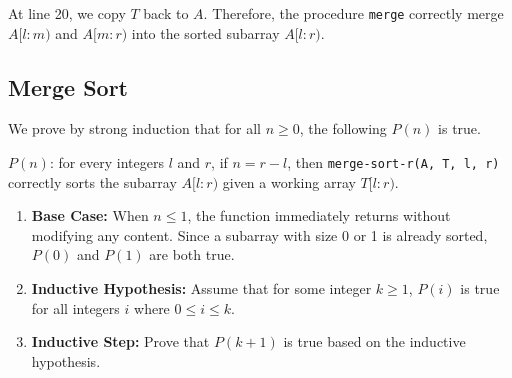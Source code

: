 \documentclass[12pt]{article}
\begin{document}
At line 20, we copy \(T\) back to \(A\). Therefore, the procedure \verb|merge| correctly merge \(A[l : m)\) and \(A[m : r)\) into the sorted subarray \(A[l : r)\).

\subsection*{Merge Sort}

We prove by strong induction that for all \(n \geq 0\), the following \(P(n)\) is true.

\(P(n)\): for every integers \(l\) and \(r\), if \(n = r - l\), then \verb|merge-sort-r(A, T, l, r)| correctly sorts the subarray \(A[l : r)\) given a working array \(T[l : r)\).

\begin{enumerate}
    \item \textbf{Base Case:} When \(n \leq 1\), the function immediately returns without modifying any content. Since a subarray with size 0 or 1 is already sorted, \(P(0)\) and \(P(1)\) are both true.

    \item \textbf{Inductive Hypothesis:} Assume that for some integer \(k \geq 1\), \(P(i)\) is true for all integers \(i\) where \(0 \leq i \leq k\).

    \item \textbf{Inductive Step:} Prove that \(P(k+1)\) is true based on the inductive hypothesis.


\end{enumerate}
\end{document}
